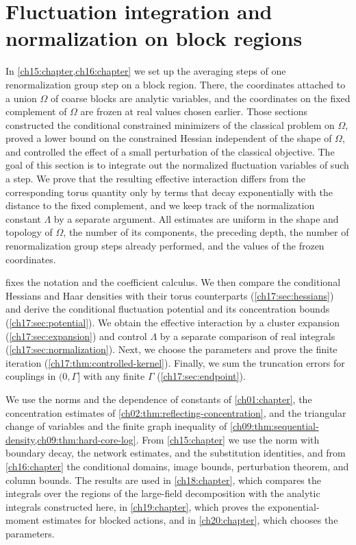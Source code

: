 \chapter{Fluctuation integration and normalization on block regions}\label{ch17:chapter}

In \cref{ch15:chapter,ch16:chapter} we set up the averaging steps of one renormalization group step on a block region. There, the coordinates attached to a union $\Omega$ of coarse blocks are analytic variables, and the coordinates on the fixed complement of $\Omega$ are frozen at real values chosen earlier. Those sections constructed the conditional constrained minimizers of the classical problem on $\Omega$, proved a lower bound on the constrained Hessian independent of the shape of $\Omega$, and controlled the effect of a small perturbation of the classical objective. The goal of this section is to integrate out the normalized fluctuation variables of such a step. We prove that the resulting effective interaction differs from the corresponding torus quantity only by terms that decay exponentially with the distance to the fixed complement, and we keep track of the normalization constant $\Lambda$ by a separate argument. All estimates are uniform in the shape and topology of $\Omega$, the number of its components, the preceding depth, the number of renormalization group steps already performed, and the values of the frozen coordinates.

 fixes the notation and the coefficient calculus. We then compare the conditional Hessians and Haar densities with their torus counterparts (\cref{ch17:sec:hessians}) and derive the conditional fluctuation potential and its concentration bounds (\cref{ch17:sec:potential}). We obtain the effective interaction by a cluster expansion (\cref{ch17:sec:expansion}) and control $\Lambda$ by a separate comparison of real integrals (\cref{ch17:sec:normalization}). Next, we choose the parameters and prove the finite iteration (\cref{ch17:thm:controlled-kernel}). Finally, we sum the truncation errors for couplings in $(0,\Gamma]$ with any finite $\Gamma$ (\cref{ch17:sec:endpoint}).

We use the norms and the dependence of constants of \cref{ch01:chapter}, the concentration estimates of \cref{ch02:thm:reflecting-concentration}, and the triangular change of variables and the finite graph inequality of \cref{ch09:thm:sequential-density,ch09:thm:hard-core-log}. From \cref{ch15:chapter} we use the norm with boundary decay, the network estimates, and the substitution identities, and from \cref{ch16:chapter} the conditional domains, image bounds, perturbation theorem, and column bounds. The results are used in \cref{ch18:chapter}, which compares the integrals over the regions of the large-field decomposition with the analytic integrals constructed here, in \cref{ch19:chapter}, which proves the exponential-moment estimates for blocked actions, and in \cref{ch20:chapter}, which chooses the parameters.

